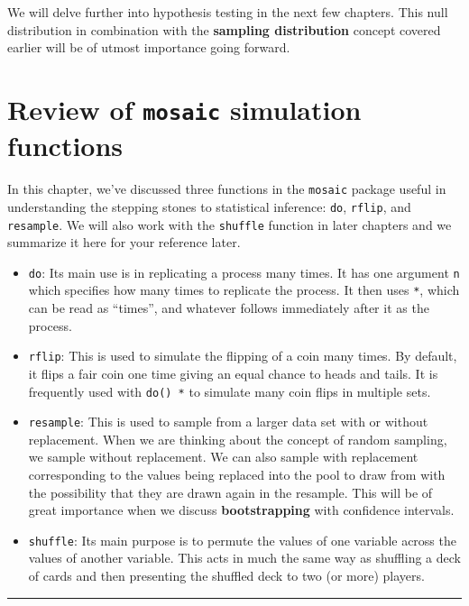 \documentclass[]{tufte-book}
\let\oldrule=\rule
\renewcommand{\rule}[1]{\oldrule{\linewidth}}
\begin{document}
We will delve further into hypothesis testing in the next few chapters.
This null distribution in combination with the \textbf{sampling
distribution} concept covered earlier will be of utmost importance going
forward.

\section{\texorpdfstring{Review of \texttt{mosaic} simulation
functions}{Review of mosaic simulation functions}}\label{review-of-mosaic-simulation-functions}

In this chapter, we've discussed three functions in the \texttt{mosaic}
package useful in understanding the stepping stones to statistical
inference: \texttt{do}, \texttt{rflip}, and \texttt{resample}. We will
also work with the \texttt{shuffle} function in later chapters and we
summarize it here for your reference later.

\begin{itemize}
\item
  \texttt{do}: Its main use is in replicating a process many times. It
  has one argument \texttt{n} which specifies how many times to
  replicate the process. It then uses \texttt{*}, which can be read as
  ``times'', and whatever follows immediately after it as the process.
\item
  \texttt{rflip}: This is used to simulate the flipping of a coin many
  times. By default, it flips a fair coin one time giving an equal
  chance to heads and tails. It is frequently used with \texttt{do()\ *}
  to simulate many coin flips in multiple sets.
\item
  \texttt{resample}: This is used to sample from a larger data set with
  or without replacement. When we are thinking about the concept of
  random sampling, we sample without replacement. We can also sample
  with replacement corresponding to the values being replaced into the
  pool to draw from with the possibility that they are drawn again in
  the resample. This will be of great importance when we discuss
  \textbf{bootstrapping} with confidence intervals.
\item
  \texttt{shuffle}: Its main purpose is to permute the values of one
  variable across the values of another variable. This acts in much the
  same way as shuffling a deck of cards and then presenting the shuffled
  deck to two (or more) players.
\end{itemize}

\begin{center}\rule{0.5\linewidth}{\linethickness}\end{center}
\end{document}
